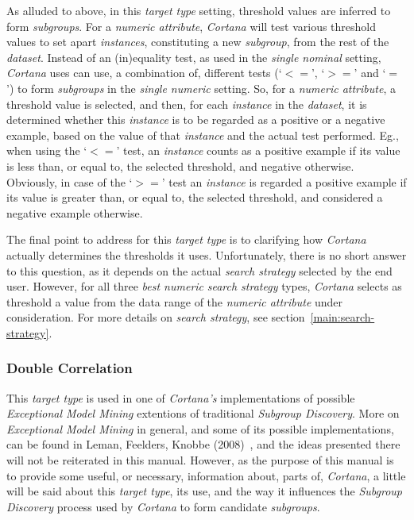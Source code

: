 \documentclass{article}
\begin{document}
As alluded to above, in this \emph{target type} setting, threshold values are inferred to form \emph{subgroups}.
For a \emph{numeric attribute}, \emph{Cortana} will test various threshold values to set apart \emph{instances}, constituting a new \emph{subgroup}, from the rest of the \emph{dataset}.
Instead of an (in)equality test, as used in the \emph{single nominal} setting, \emph{Cortana} uses can use, a combination of, different tests (`$<=$', `$>=$' and `$=$') to form \emph{subgroups} in the \emph{single numeric} setting.
So, for a \emph{numeric attribute}, a threshold value is selected, and then, for each \emph{instance} in the \emph{dataset}, it is determined whether this \emph{instance} is to be regarded as a positive or a negative example, based on the value of that \emph{instance} and the actual test performed.
Eg., when using the `$<=$' test, an \emph{instance} counts as a positive example if its value is less than, or equal to, the selected threshold, and negative otherwise.
Obviously, in case of the `$>=$' test an \emph{instance} is regarded a positive example if its value is greater than, or equal to, the selected threshold, and considered a negative example otherwise.

The final point to address for this \emph{target type} is to clarifying how \emph{Cortana} actually determines the thresholds it uses.
Unfortunately, there is no short answer to this question, as it depends on the actual \emph{search strategy} selected by the end user.
However, for all three \emph{best numeric} \emph{search strategy} types, \emph{Cortana} selects as threshold a value from the data range of the \emph{numeric attribute} under consideration.
For more details on \emph{search strategy}, see section~\ref{main:search-strategy}.

\subsubsection{Double Correlation}
This \emph{target type} is used in one of \emph{Cortana's} implementations of possible \emph{Exceptional Model Mining} extentions of traditional \emph{Subgroup Discovery}.
More on \emph{Exceptional Model Mining} in general, and some of its possible implementations, can be found in Leman, Feelders, Knobbe (2008)~\cite{emm}, and the ideas presented there will not be reiterated in this manual.
However, as the purpose of this manual is to provide some useful, or necessary, information about, parts of,  \emph{Cortana}, a little will be said about this \emph{target type}, its use, and the way it influences the \emph{Subgroup Discovery} process used by \emph{Cortana} to form candidate \emph{subgroups}.
\end{document}

